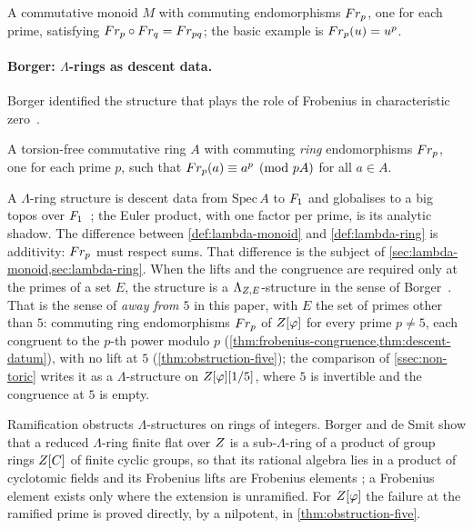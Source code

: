 \begin{definition}\label{def:lambda-monoid}
A commutative monoid $M$ with commuting endomorphisms $Fr_p$, one for each
prime, satisfying $Fr_p\circ Fr_q=Fr_{pq}$; the basic example is
$Fr_p(u)=u^p$.
\end{definition}

\paragraph{Borger: $\Lambda$-rings as descent data.}
Borger identified the structure that plays the role of Frobenius in
characteristic zero~\cite{borger09,borger11}.

\begin{definition}\label{def:lambda-ring}
A torsion-free commutative ring $A$ with commuting \emph{ring} endomorphisms
$Fr_p$, one for each prime $p$, such that $Fr_p(a)\equiv a^p\pmod{pA}$
for all $a\in A$.
\end{definition}

A $\Lambda$-ring structure is descent data from $\mathrm{Spec}\,A$ to $F_1$ and
globalises to a big topos over $F_1$~\cite{borger09,borger11}; the Euler
product, with one factor per prime, is its analytic shadow.  The difference
between \cref{def:lambda-monoid} and \cref{def:lambda-ring} is additivity:
$Fr_p$ must respect sums.  That difference is the subject of
\cref{sec:lambda-monoid,sec:lambda-ring}.  When the lifts and the congruence are required only at the primes of
a set $E$, the structure is a $\Lambda_{Z,E}$-structure in the sense of Borger~\cite[\S1]{borger11}.  That is the sense of \emph{away
from $5$} in this paper, with $E$ the set of primes other than $5$: commuting ring endomorphisms $Fr_p$ of $Z[\varphi]$ for every prime $p\ne5$, each congruent
to the $p$-th power modulo $p$ (\cref{thm:frobenius-congruence,thm:descent-datum}), with no lift at $5$
(\cref{thm:obstruction-five}); the comparison of \cref{ssec:non-toric} writes it as a $\Lambda$-structure on
$Z[\varphi][1/5]$, where $5$ is invertible and the congruence at $5$ is empty.
\begin{remark}
Ramification obstructs $\Lambda$-structures on rings of integers.  Borger and de Smit
show that a reduced $\Lambda$-ring finite flat over $Z$ is a sub-$\Lambda$-ring of a
product of group rings $Z[C]$ of finite cyclic groups, so that its rational algebra
lies in a product of cyclotomic fields and its Frobenius lifts are Frobenius
elements \cite[Thm.~0.1 and Cor.~0.3]{borgerdesmit08}; a Frobenius element exists only where the
extension is unramified.  For $Z[\varphi]$ the failure at the ramified prime is proved
directly, by a nilpotent, in \cref{thm:obstruction-five}.
\end{remark}

